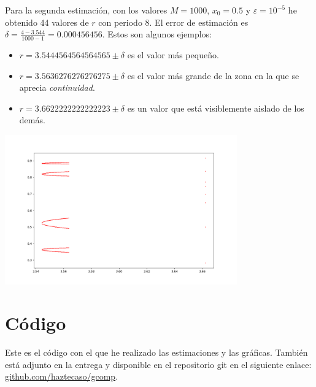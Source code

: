 \documentclass[10pt, spanish]{article}
\theoremstyle{definition}
\theoremstyle{break}
\begin{document}
Para la segunda estimación, con los valores $M=1000$, $x_0=0.5$ y
$\varepsilon=10^{-5}$ he obtenido 44 valores de $r$ con periodo $8$. El error de
estimación es $\delta = \frac{4-3.544}{1000-1}=0.000456456$. Estos son
algunos ejemplos:
\begin{itemize}
    \item $r = 3.5444564564564565\pm \delta$ es el valor más pequeño.
    \item $r= 3.5636276276276275\pm\delta$ es el valor más grande de la zona en
        la que se aprecia \textit{continuidad}.
    \item $r=3.6622222222222223\pm\delta$ es un valor que está
        visiblemente aislado de los demás.
\end{itemize}

\begin{center}
\includegraphics[width=10cm]{plot02}
\end{center}

\section{Código}

Este es el código con el que he realizado las estimaciones y las gráficas.
También está adjunto en la entrega y disponible en el repositorio git en el
siguiente enlace: \href{https://www.github.com/haztecaso/gcomp}{github.com/haztecaso/gcomp}.

% 

\end{document}
